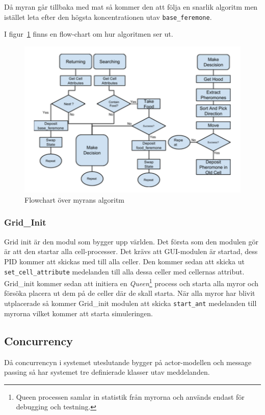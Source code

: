 \documentclass[12pt]{article}
\begin{document}
Då myran går tillbaka med mat så kommer den att följa en snarlik algoritm men istället leta efter den högsta koncentrationen utav \texttt{base\_feremone}.

I figur~\ref{fig:ant-algorithm} finns en flow-chart om hur algoritmen ser ut.


\begin{figure}
    \centering
    \includegraphics[width=\textwidth]{BugsLife-Fig3.png}
    \caption{Flowchart över myrans algoritm}
    \label{fig:ant-algorithm}
\end{figure}

\subsubsection{Grid\_Init}
Grid init är den modul som bygger upp världen.
Det första som den modulen gör är att den startar alla cell-processer.
Det krävs att GUI-modulen är startad,
dess PID kommer att skickas med till alla celler.
Den kommer sedan att skicka ut \texttt{set\_cell\_attribute} medelanden till alla dessa celler med cellernas attribut.
Grid\_init kommer sedan att initiera en \textit{Queen}\footnote{Queen processen samlar in statistik från myrorna och används endast för debugging och testning.} process och starta alla myror och försöka placera ut dem på de celler där de skall starta.
När alla myror har blivit utplacerade så kommer Grid\_init modulen att skicka \texttt{start\_ant} medelanden till myrorna vilket kommer att starta simuleringen.

\subsection{Concurrency}
Då concurrencyn i systemet uteslutande bygger på actor-modellen och message passing så har systemet tre definierade klasser utav meddelanden.
\end{document}
